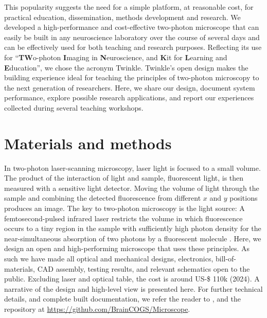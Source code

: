 \documentclass[10pt,letterpaper]{article}
\begin{document}
This popularity suggests the need for a simple platform, at reasonable cost, for practical education, dissemination, methods development and research. We developed a high-performance and cost-effective two-photon microscope that can easily be built in any neuroscience laboratory over the course of several days and can be effectively used for both teaching and research purposes. Reflecting its use for ``\textbf{TW}o-photon \textbf{I}maging in \textbf{N}euroscience, and \textbf{K}it for \textbf{L}earning and \textbf{E}ducation'', we chose the acronym Twinkle. Twinkle's open design makes the building experience ideal for teaching the principles of two-photon microscopy to the next generation of researchers. Here, we share our design, document system performance, explore possible research applications, and report our experiences collected during several teaching workshops.

\section*{Materials and methods}
In two-photon laser-scanning microscopy\cite{Denk1990}, laser light is focused to a small volume. The product of the interaction of light and sample, fluorescent light, is then measured with a sensitive light detector. Moving the volume of light through the sample and combining the detected fluorescence from different $x$ and $y$ positions produces an image. The key to two-photon microscopy is the light source: A femtosecond-pulsed infrared laser restricts the volume in which fluorescence occurs to a tiny region in the sample with sufficiently high photon density for the near-simultaneous absorption of two photons by a fluorescent molecule \cite{Denk1990, Svoboda1997, So2000, Helmchen2005}.\newline
Here, we design an open and high-performing microscope that uses these principles. As such we have made all optical and mechanical designs, electronics, bill-of-materials, CAD assembly, testing results, and relevant schematics open to the public. Excluding laser and optical table, the cost is around US-\$ 110k (2024). A narrative of the design and high-level view is presented here. For further technical details, and complete built documentation, we refer the reader to , and the repository at \url{https://github.com/BrainCOGS/Microscope}.
\end{document}
